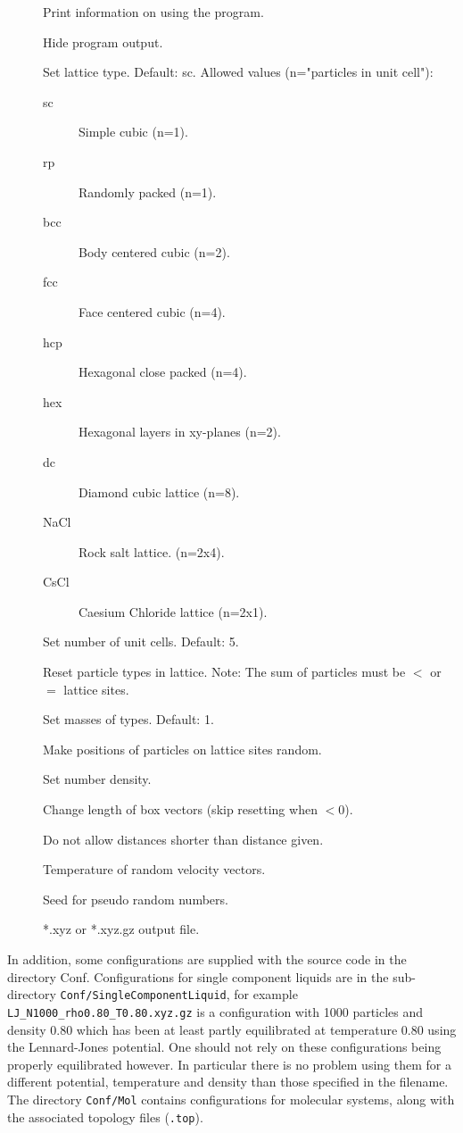 \documentclass[a4paper]{article}
\begin{document}
\begin{description}
\item[] Print information on using the program.
\item[] Hide program output.
\item[] Set lattice type. Default: sc. Allowed values (n="particles in unit cell"):
 \begin{description}
  \item[sc] Simple cubic (n=1).
  \item[rp] Randomly packed (n=1).
  \item[bcc] Body centered cubic (n=2).
  \item[fcc] Face centered cubic (n=4).
  \item[hcp] Hexagonal close packed (n=4).
  \item[hex] Hexagonal layers in xy-planes (n=2).
  \item[dc]  Diamond cubic lattice (n=8).
  \item[NaCl] Rock salt lattice. (n=2x4).
  \item[CsCl] Caesium Chloride lattice (n=2x1).
 \end{description}
\item[] Set number of unit cells. Default: 5.
\item[] Reset particle types in lattice. Note: The sum of particles must be $<$ or $=$ lattice sites.
\item[]  Set masses of types. Default: 1.
\item[]  Make positions of particles on lattice sites random.
\item[] Set number density.
\item[] Change length of box vectors (skip resetting when $<$0).
\item[] Do not allow distances shorter than distance given.
\item[] Temperature of random velocity vectors.
\item[] Seed for pseudo random numbers.
\item[]  *.xyz or *.xyz.gz output file.
\end{description}


In addition, some configurations are supplied with the source code in the directory Conf. 
Configurations for single component liquids are in the sub-directory 
\verb|Conf/SingleComponentLiquid|, for example \verb|LJ_N1000_rho0.80_T0.80.xyz.gz| is a 
configuration with 1000 particles and density 0.80 which has been at least 
partly equilibrated at temperature 0.80 using the Lennard-Jones potential. One 
should not rely on these configurations being properly equilibrated however.
In particular there is no problem using them for a different potential, 
temperature and density than those specified in the filename. The directory
\verb|Conf/Mol| contains configurations for molecular systems, along with the
associated topology files (\verb|.top|).
\end{document}
